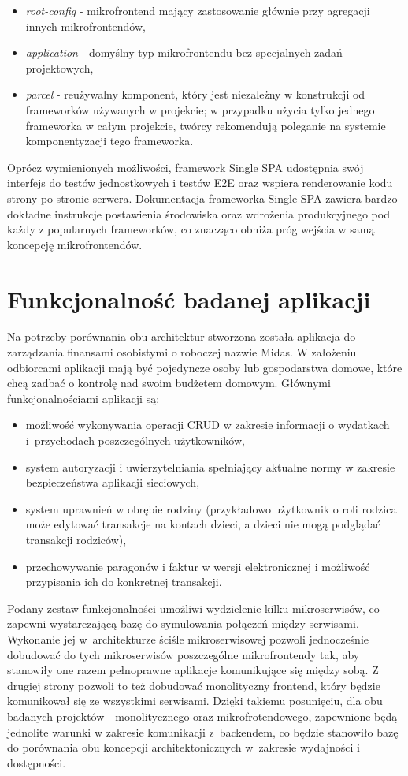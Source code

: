 \documentclass{SGGW-thesis}
\begin{document}
{\begin{itemize}
	\item \textit{root-config} - mikrofrontend mający zastosowanie głównie przy agregacji innych mikrofrontendów,
	\item \textit{application} - domyślny typ mikrofrontendu bez specjalnych zadań projektowych,
	\item \textit{parcel} - reużywalny komponent, który jest niezależny w konstrukcji od frameworków używanych w projekcie; w przypadku użycia tylko jednego frameworka w całym projekcie, twórcy rekomendują \cite{singlespa-parcels} poleganie na systemie komponentyzacji tego frameworka.
\end{itemize}

Oprócz wymienionych możliwości, framework Single SPA udostępnia swój interfejs do testów jednostkowych i testów E2E oraz wspiera renderowanie kodu strony po stronie serwera. Dokumentacja frameworka Single SPA zawiera bardzo dokładne instrukcje postawienia środowiska oraz wdrożenia produkcyjnego pod każdy z popularnych frameworków, co znacząco obniża próg wejścia w samą koncepcję mikrofrontendów.

\chapter{Funkcjonalność badanej aplikacji}
Na potrzeby porównania obu architektur stworzona została aplikacja do zarządzania finansami osobistymi o roboczej nazwie Midas. W założeniu odbiorcami aplikacji mają być pojedyncze osoby lub gospodarstwa domowe, które chcą zadbać o kontrolę nad swoim budżetem domowym. Głównymi funkcjonalnościami aplikacji są:

\begin{itemize}
	\item możliwość wykonywania operacji CRUD w zakresie informacji o wydatkach i~przychodach poszczególnych użytkowników,
	\item system autoryzacji i uwierzytelniania spełniający aktualne normy w zakresie bezpieczeństwa aplikacji sieciowych,
	\item system uprawnień w obrębie rodziny (przykładowo użytkownik o roli rodzica może edytować transakcje na kontach dzieci, a dzieci nie mogą podglądać transakcji rodziców),
	\item przechowywanie paragonów i faktur w wersji elektronicznej i możliwość przypisania ich do konkretnej transakcji.
\end{itemize}

Podany zestaw funkcjonalności umożliwi wydzielenie kilku mikroserwisów, co zapewni wystarczającą bazę do symulowania połączeń między serwisami. Wykonanie jej w~architekturze ściśle mikroserwisowej pozwoli jednocześnie dobudować do tych mikroserwisów poszczególne mikrofrontendy tak, aby stanowiły one razem pełnoprawne aplikacje komunikujące się między sobą. Z drugiej strony pozwoli to też dobudować monolityczny frontend, który będzie komunikował się ze wszystkimi serwisami. Dzięki takiemu posunięciu, dla obu badanych projektów - monolitycznego oraz mikrofrotendowego, zapewnione będą jednolite warunki w zakresie komunikacji z~backendem, co będzie stanowiło bazę do porównania obu koncepcji architektonicznych w~zakresie wydajności i dostępności.

}
\end{document}

